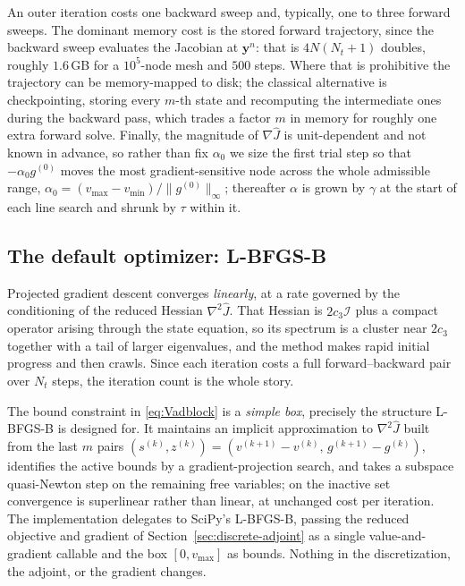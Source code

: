 \documentclass[11pt]{article}
\begin{document}
An outer iteration costs one backward sweep and, typically, one to three forward sweeps. The dominant memory cost is the stored forward trajectory, since the backward sweep evaluates the Jacobian at $\mathbf{y}^n$: that is $4N(N_t+1)$ doubles, roughly $1.6\,$GB for a $10^5$-node mesh and $500$ steps. Where that is prohibitive the trajectory can be memory-mapped to disk; the classical alternative is checkpointing, storing every $m$-th state and recomputing the intermediate ones during the backward pass, which trades a factor $m$ in memory for roughly one extra forward solve. Finally, the magnitude of $\nabla\hat J$ is unit-dependent and not known in advance, so rather than fix $\alpha_0$ we size the first trial step so that $-\alpha_0 g^{(0)}$ moves the most gradient-sensitive node across the whole admissible range, $\alpha_0 = (v_{\max}-v_{\min})/\lVert g^{(0)}\rVert_\infty$; thereafter $\alpha$ is grown by $\gamma$ at the start of each line search and shrunk by $\tau$ within it.

\subsection{The default optimizer: L-BFGS-B}
\label{sec:lbfgs}

Projected gradient descent converges \emph{linearly}, at a rate governed by the conditioning of the reduced Hessian $\nabla^2\hat J$. That Hessian is $2c_3\mathcal{I}$ plus a compact operator arising through the state equation, so its spectrum is a cluster near $2c_3$ together with a tail of larger eigenvalues, and the method makes rapid initial progress and then crawls. Since each iteration costs a full forward--backward pair over $N_t$ steps, the iteration count is the whole story.

The bound constraint in \eqref{eq:Vadblock} is a \emph{simple box}, precisely the structure L-BFGS-B is designed for. It maintains an implicit approximation to $\nabla^2\hat J$ built from the last $m$ pairs $(s^{(k)},z^{(k)}) = (v^{(k+1)}-v^{(k)},\,g^{(k+1)}-g^{(k)})$, identifies the active bounds by a gradient-projection search, and takes a subspace quasi-Newton step on the remaining free variables; on the inactive set convergence is superlinear rather than linear, at unchanged cost per iteration. The implementation delegates to SciPy's L-BFGS-B, passing the reduced objective and gradient of Section~\ref{sec:discrete-adjoint} as a single value-and-gradient callable and the box $[0,v_{\max}]$ as bounds. Nothing in the discretization, the adjoint, or the gradient changes.
\end{document}
